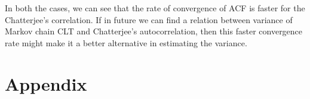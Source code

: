 \documentclass{article}
\begin{document}
	In both the cases, we can see that the rate of convergence of ACF is faster for the Chatterjee's correlation.
	If in future we can find a relation between variance of Markov chain CLT and Chatterjee's autocorrelation,
	then this faster convergence rate might make it a better alternative in estimating the variance.



\section{Appendix}
\end{document}
